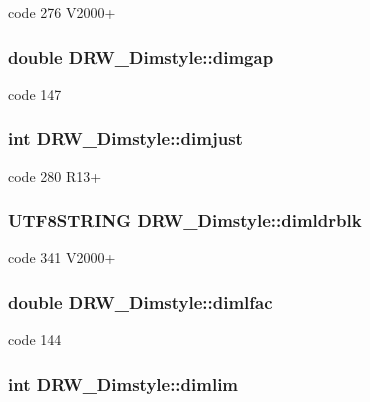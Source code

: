 code 276 V2000+ \hypertarget{classDRW__Dimstyle_af258a983498f66472b6c5b51d368980b}{
\subsubsection[{dimgap}]{\setlength{\rightskip}{0pt plus 5cm}double D\-R\-W\-\_\-\-Dimstyle\-::dimgap}}\label{classDRW__Dimstyle_af258a983498f66472b6c5b51d368980b}
code 147 \hypertarget{classDRW__Dimstyle_a065205dcc5446262657b612353aa3deb}{
\subsubsection[{dimjust}]{\setlength{\rightskip}{0pt plus 5cm}int D\-R\-W\-\_\-\-Dimstyle\-::dimjust}}\label{classDRW__Dimstyle_a065205dcc5446262657b612353aa3deb}
code 280 R13+ \hypertarget{classDRW__Dimstyle_a975377a787e4ca8a515f20f277d7a805}{
\subsubsection[{dimldrblk}]{\setlength{\rightskip}{0pt plus 5cm}U\-T\-F8\-S\-T\-R\-I\-N\-G D\-R\-W\-\_\-\-Dimstyle\-::dimldrblk}}\label{classDRW__Dimstyle_a975377a787e4ca8a515f20f277d7a805}
code 341 V2000+ \hypertarget{classDRW__Dimstyle_ac74c4cc07bf6edde4b563d8f5fb03d8e}{
\subsubsection[{dimlfac}]{\setlength{\rightskip}{0pt plus 5cm}double D\-R\-W\-\_\-\-Dimstyle\-::dimlfac}}\label{classDRW__Dimstyle_ac74c4cc07bf6edde4b563d8f5fb03d8e}
code 144 \hypertarget{classDRW__Dimstyle_ae5324505be40acd3ed0450d39d3bd120}{
\subsubsection[{dimlim}]{\setlength{\rightskip}{0pt plus 5cm}int D\-R\-W\-\_\-\-Dimstyle\-::dimlim}}\label{classDRW__Dimstyle_ae5324505be40acd3ed0450d39d3bd120}
